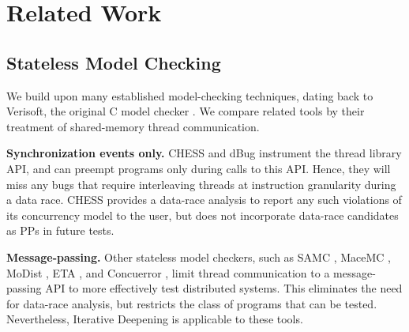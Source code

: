 \section{Related Work}
\label{sec:related}

\subsection{Stateless Model Checking}

We build upon many established model-checking techniques, dating back
to Verisoft, the original C model checker \cite{verisoft}.
We compare related tools by their treatment of shared-memory thread communication.

{\bf Synchronization events only.} CHESS \cite{chess} and dBug \cite{dbug-ssv} instrument the thread library API, and can preempt programs only during calls to this API.
Hence, they will miss any bugs that require interleaving threads at instruction granularity during a data race. CHESS provides a data-race analysis to report any such violations of its concurrency model to the user, but does not incorporate data-race candidates as PPs in future tests.

{\bf Message-passing.} Other stateless model checkers, such as SAMC \cite{samc}, MaceMC \cite{macemc}, MoDist \cite{modist}, ETA \cite{dbug-retreat}, and Concuerror \cite{optimal-dpor},
limit thread communication to a message-passing API to more effectively test distributed systems.
This eliminates the need for data-race analysis, but restricts the class of programs that can be tested.
Nevertheless, Iterative Deepening is applicable to these tools.

